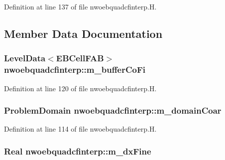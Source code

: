 Definition at line 137 of file nwoebquadcfinterp.\+H.



\subsection{Member Data Documentation}
\subsubsection[{\texorpdfstring{m\+\_\+buffer\+Co\+Fi}{m_bufferCoFi}}]{\setlength{\rightskip}{0pt plus 5cm}Level\+Data$<$E\+B\+Cell\+F\+AB$>$ nwoebquadcfinterp\+::m\+\_\+buffer\+Co\+Fi\hspace{0.3cm}{\ttfamily [protected]}}\hypertarget{classnwoebquadcfinterp_a04df0f05122e309194e9fb1d70912a04}{}\label{classnwoebquadcfinterp_a04df0f05122e309194e9fb1d70912a04}


Definition at line 120 of file nwoebquadcfinterp.\+H.

\subsubsection[{\texorpdfstring{m\+\_\+domain\+Coar}{m_domainCoar}}]{\setlength{\rightskip}{0pt plus 5cm}Problem\+Domain nwoebquadcfinterp\+::m\+\_\+domain\+Coar\hspace{0.3cm}{\ttfamily [protected]}}\hypertarget{classnwoebquadcfinterp_a81c6feda61f3f2a1cd0f6b3c42b5e513}{}\label{classnwoebquadcfinterp_a81c6feda61f3f2a1cd0f6b3c42b5e513}


Definition at line 114 of file nwoebquadcfinterp.\+H.

\subsubsection[{\texorpdfstring{m\+\_\+dx\+Fine}{m_dxFine}}]{\setlength{\rightskip}{0pt plus 5cm}Real nwoebquadcfinterp\+::m\+\_\+dx\+Fine\hspace{0.3cm}{\ttfamily [protected]}}\hypertarget{classnwoebquadcfinterp_a92a63d0a83b16426c81b74f32c39629c}{}\label{classnwoebquadcfinterp_a92a63d0a83b16426c81b74f32c39629c}


